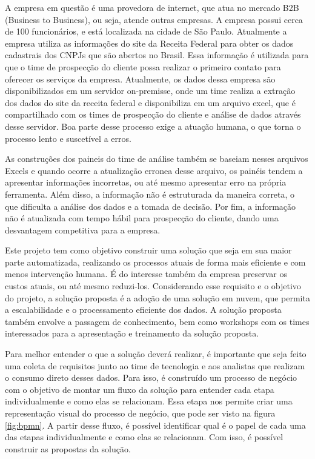 A empresa em questão é uma provedora de internet, que atua no mercado B2B (Business to Business), ou seja, atende outras empresas. A empresa possui cerca de 100 funcionários, e está localizada na cidade de São Paulo. Atualmente a empresa utiliza as informações do site da Receita Federal para obter os dados cadastrais dos CNPJs que são abertos no Brasil. Essa informação é utilizada para que o time de prospecção do cliente possa realizar o primeiro contato para oferecer os serviços da empresa. Atualmente, os dados dessa empresa são disponibilizados em um servidor on-premisse, onde um time realiza a extração dos dados do site da receita federal e disponibiliza em um arquivo excel, que é compartilhado com os times de prospecção do cliente e análise de dados através desse servidor. Boa parte desse processo exige a atuação humana, o que torna o processo lento e suscetível a erros. 

As construções dos paineis do time de análise também se baseiam nesses arquivos Excels e quando ocorre a atualização erronea desse arquivo, os painéis tendem a apresentar informações incorretas, ou até mesmo apresentar erro na própria ferramenta. Além disso, a informação não é estruturada da maneira correta, o que dificulta a análise dos dados e a tomada de decisão. Por fim, a informação não é atualizada com tempo hábil para prospecção do cliente, dando uma desvantagem competitiva para a empresa.

Este projeto tem como objetivo construir uma solução que seja em sua maior parte automatizada, realizando os processos atuais de forma 
mais eficiente e com menos intervenção humana. É do interesse também da empresa preservar os custos atuais, ou até mesmo reduzi-los. Considerando esse requisito e o objetivo do projeto, a solução proposta é a adoção de uma solução em nuvem, que permita a escalabilidade e o processamento eficiente dos dados. A solução proposta também envolve a passagem de conhecimento, bem como workshops com os times interessados para a apresentação e treinamento da solução proposta.

Para melhor entender o que a solução deverá realizar, é importante que seja feito uma coleta de requisitos junto ao time de tecnologia e aos analistas que realizam o consumo direto desses dados. Para isso, é construído um processo de negócio com o objetivo de montar um fluxo da solução para entender cada etapa individualmente e como elas se relacionam. Essa etapa nos permite criar uma representação visual do processo de negócio, que pode ser visto na figura \ref{fig:bpmn}. A partir desse fluxo, é possível identificar qual é o papel de cada uma das etapas individualmente e como elas se relacionam. Com isso, é possível construir as propostas da solução.

